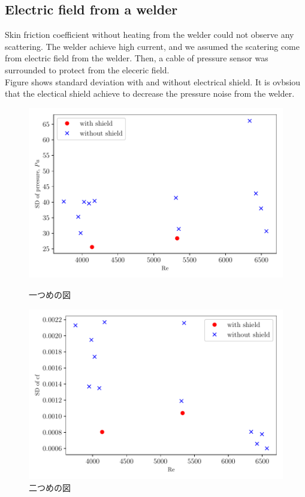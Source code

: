 \documentclass[12pt,oneside]{jbook}
\begin{document}
\subsection{Electric field from a welder}
Skin friction coefficient without heating from the welder could not observe any scattering.
The welder achieve high current, and we assumed the scatering come from electric field from the welder.
Then, a cable of pressure sensor was surrounded to protect from the eleceric field.\\
Figure shows standard deviation with and without electrical shield.
It is ovbsiou that the electical shield achieve to decrease the pressure noise from the welder.
\begin{figure}[t]
    \begin{minipage}{0.5\hsize}
        \begin{center}
            \includegraphics[width=1\linewidth]{fig/SD_shield4prresure.pdf}
        \end{center}
        \caption{一つめの図}
        \label{fig:one}
    \end{minipage}
    \begin{minipage}{0.5\hsize}
        \begin{center}
            \includegraphics[width=1\linewidth]{fig/SD_shield4cf.pdf}
        \end{center}
        \caption{二つめの図}
        \label{fig:two}
    \end{minipage}
\end{figure}
\end{document}
